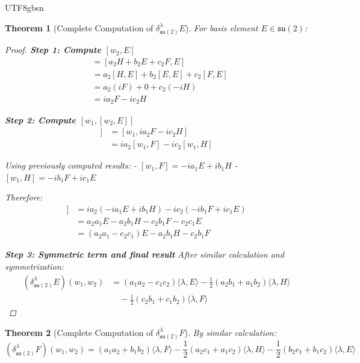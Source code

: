 \documentclass[a4paper,12pt]{extarticle}
\newtheorem{theorem}{Theorem}[section]
\theoremstyle{definition}
\begin{document}
\begin{CJK}{UTF8}{gbsn}
\begin{theorem}[Complete Computation of $\delta^\lambda_{\mathfrak{su}(2)}E$]
\label{thm:spencer_operator_E}
For basis element $E \in \mathfrak{su}(2)$:

\begin{proof}
\textbf{Step 1: Compute $[w_2, E]$}
\begin{align}
[w_2, E] &= [a_2 H + b_2 E + c_2 F, E]\\
&= a_2[H, E] + b_2[E, E] + c_2[F, E]\\
&= a_2(iF) + 0 + c_2(-iH)\\
&= ia_2 F - ic_2 H
\end{align}

\textbf{Step 2: Compute $[w_1, [w_2, E]]$}
\begin{align}
[w_1, [w_2, E]] &= [w_1, ia_2 F - ic_2 H]\\
&= ia_2[w_1, F] - ic_2[w_1, H]
\end{align}

Using previously computed results:
- $[w_1, F] = -ia_1 E + ib_1 H$
- $[w_1, H] = -ib_1 F + ic_1 E$

Therefore:
\begin{align}
[w_1, [w_2, E]] &= ia_2(-ia_1 E + ib_1 H) - ic_2(-ib_1 F + ic_1 E)\\
&= a_2 a_1 E - a_2 b_1 H - c_2 b_1 F - c_2 c_1 E\\
&= (a_2 a_1 - c_2 c_1)E - a_2 b_1 H - c_2 b_1 F
\end{align}

\textbf{Step 3: Symmetric term and final result}
After similar calculation and symmetrization:
\begin{align}
(\delta^\lambda_{\mathfrak{su}(2)}E)(w_1, w_2) &= (a_1 a_2 - c_1 c_2)\langle\lambda, E\rangle - \frac{1}{2}(a_2 b_1 + a_1 b_2)\langle\lambda, H\rangle\\
&\quad - \frac{1}{2}(c_2 b_1 + c_1 b_2)\langle\lambda, F\rangle
\end{align}
\end{proof}
\end{theorem}

\begin{theorem}[Complete Computation of $\delta^\lambda_{\mathfrak{su}(2)}F$]
\label{thm:spencer_operator_F}
By similar calculation:
$$(\delta^\lambda_{\mathfrak{su}(2)}F)(w_1, w_2) = (a_1 a_2 + b_1 b_2)\langle\lambda, F\rangle - \frac{1}{2}(a_2 c_1 + a_1 c_2)\langle\lambda, H\rangle - \frac{1}{2}(b_2 c_1 + b_1 c_2)\langle\lambda, E\rangle$$
\end{theorem}


\end{CJK}
\end{document}
